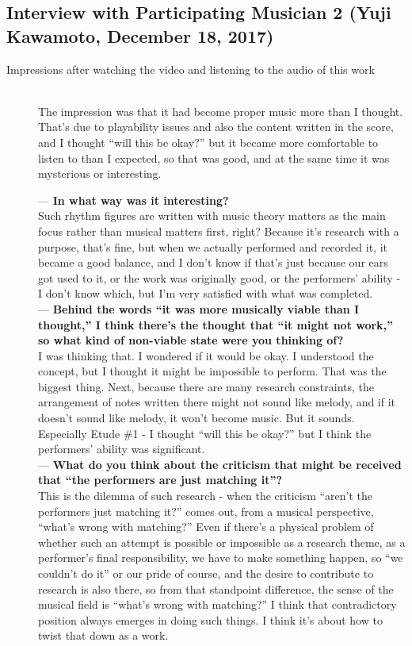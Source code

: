 \subsection{Interview with Participating Musician 2 (Yuji Kawamoto, December 18, 2017)}

\begin{description}
\item[Impressions after watching the video and listening to the audio of this work]\mbox{}\\

The impression was that it had become proper music more than I thought. That's due to playability issues and also the content written in the score, and I thought ``will this be okay?'' but it became more comfortable to listen to than I expected, so that was good, and at the same time it was mysterious or interesting.

--- {\bf In what way was it interesting?}\\

Such rhythm figures are written with music theory matters as the main focus rather than musical matters first, right? Because it's research with a purpose, that's fine, but when we actually performed and recorded it, it became a good balance, and I don't know if that's just because our ears got used to it, or the work was originally good, or the performers' ability - I don't know which, but I'm very satisfied with what was completed.\\

--- {\bf Behind the words ``it was more musically viable than I thought,'' I think there's the thought that ``it might not work,'' so what kind of non-viable state were you thinking of?}\\

I was thinking that. I wondered if it would be okay. I understood the concept, but I thought it might be impossible to perform. That was the biggest thing. Next, because there are many research constraints, the arrangement of notes written there might not sound like melody, and if it doesn't sound like melody, it won't become music. But it sounds. Especially Etude \#1 - I thought ``will this be okay?'' but I think the performers' ability was significant.\\

--- {\bf What do you think about the criticism that might be received that ``the performers are just matching it''?}\\

This is the dilemma of such research - when the criticism ``aren't the performers just matching it?'' comes out, from a musical perspective, ``what's wrong with matching?'' Even if there's a physical problem of whether such an attempt is possible or impossible as a research theme, as a performer's final responsibility, we have to make something happen, so ``we couldn't do it'' or our pride of course, and the desire to contribute to research is also there, so from that standpoint difference, the sense of the musical field is ``what's wrong with matching?'' I think that contradictory position always emerges in doing such things. I think it's about how to twist that down as a work.\\


\end{description}
